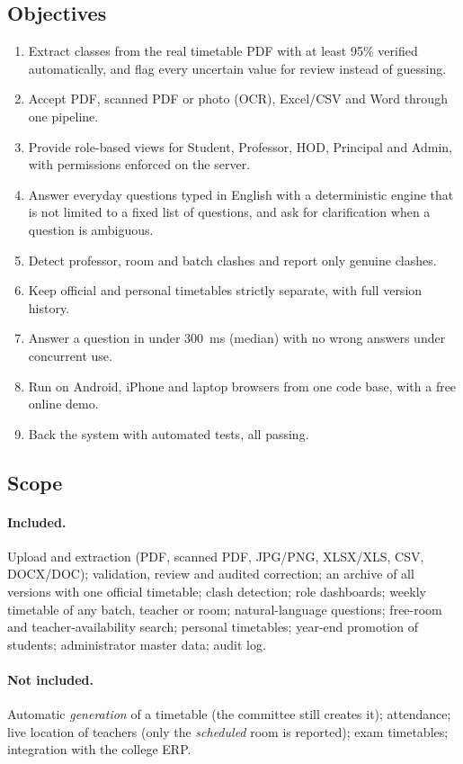 \subsection{Objectives}
\begin{enumerate}[label=\textbf{O\arabic*.}]
\item Extract classes from the real timetable PDF with at least 95\% verified automatically, and flag
      every uncertain value for review instead of guessing.
\item Accept PDF, scanned PDF or photo (OCR), Excel/CSV and Word through one pipeline.
\item Provide role-based views for Student, Professor, HOD, Principal and Admin, with permissions
      enforced on the server.
\item Answer everyday questions typed in English with a deterministic engine that is not limited to a
      fixed list of questions, and ask for clarification when a question is ambiguous.
\item Detect professor, room and batch clashes and report only genuine clashes.
\item Keep official and personal timetables strictly separate, with full version history.
\item Answer a question in under 300~ms (median) with no wrong answers under concurrent use.
\item Run on Android, iPhone and laptop browsers from one code base, with a free online demo.
\item Back the system with automated tests, all passing.
\end{enumerate}

\subsection{Scope}
\paragraph{Included.} Upload and extraction (PDF, scanned PDF, JPG/PNG, XLSX/XLS, CSV, DOCX/DOC);
validation, review and audited correction; an archive of all versions with one official timetable;
clash detection; role dashboards; weekly timetable of any batch, teacher or room; natural-language
questions; free-room and teacher-availability search; personal timetables; year-end promotion of
students; administrator master data; audit log.

\paragraph{Not included.} Automatic \emph{generation} of a timetable (the committee still creates it);
attendance; live location of teachers (only the \emph{scheduled} room is reported); exam timetables;
integration with the college ERP.

